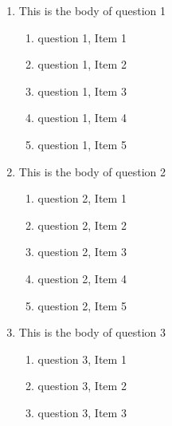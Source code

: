 \documentclass{article}
\begin{document}
\begin{enumerate}

\item
This is the body of question 1

  \begin{enumerate}

    \item
    question 1, Item 1

    \item
    question 1, Item 2

    \item
    question 1, Item 3

    \item
    question 1, Item 4

    \item
    question 1, Item 5

  \end{enumerate}

\item
This is the body of question 2

  \begin{enumerate}

    \item
    question 2, Item 1

    \item
    question 2, Item 2

    \item
    question 2, Item 3

    \item
    question 2, Item 4

    \item
    question 2, Item 5

  \end{enumerate}

\item
This is the body of question 3

  \begin{enumerate}

    \item
    question 3, Item 1

    \item
    question 3, Item 2

    \item
    question 3, Item 3


\end{enumerate}
\end{enumerate}
\end{document}
